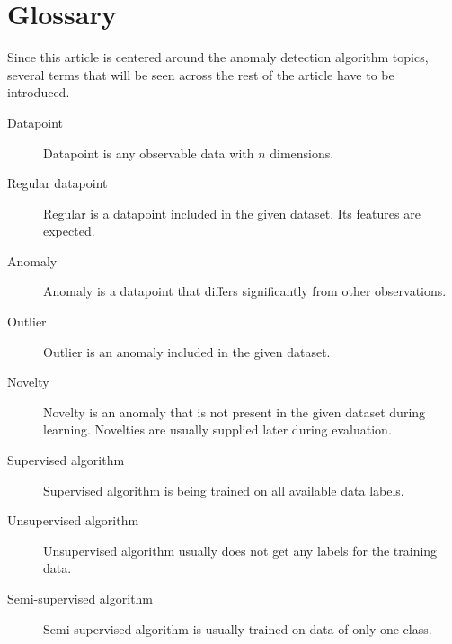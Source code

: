 
\section{Glossary}
\label{sec:theory}
Since this article is centered around the anomaly detection algorithm topics, several terms that will be seen across the rest of the article have to be introduced.
\begin{description}
    \item[Datapoint] Datapoint is any observable data with \(n\) dimensions.
    \item[Regular datapoint] Regular is a datapoint included in the given dataset. Its features are expected.
    \item[Anomaly] Anomaly is a datapoint that differs significantly from other observations.
    \item[Outlier] Outlier is an anomaly included in the given dataset.
    \item[Novelty] Novelty is an anomaly that is not present in the given dataset during
learning. Novelties are usually supplied later during evaluation.
    \item[Supervised algorithm] Supervised algorithm is being trained on all available data labels.
    \item[Unsupervised algorithm] Unsupervised algorithm usually does not get any labels for the training data.
    \item[Semi-supervised algorithm] Semi-supervised algorithm is usually trained on data of only one class.
\end{description}